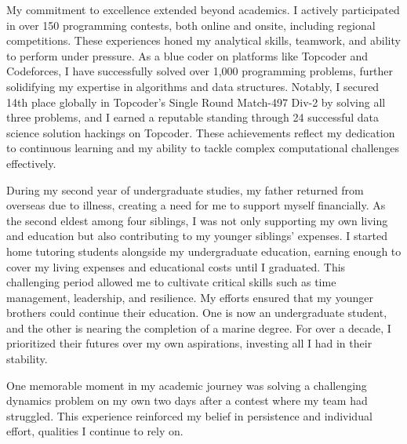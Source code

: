 \documentclass[11pt]{article}
\newif\ifshowsections
\begin{document}
\ifshowsections\section*{Programming Contest Experience}\fi

My commitment to excellence extended beyond academics. I actively participated in over 150 programming
contests, both online and onsite, including regional competitions. These experiences honed my analytical
skills, teamwork, and ability to perform under pressure. As a blue coder on platforms like Topcoder and
Codeforces, I have successfully solved over 1,000 programming problems, further solidifying my expertise
in algorithms and data structures. Notably, I secured 14th place globally in Topcoder's Single Round
Match-497 Div-2 by solving all three problems, and I earned a reputable standing through 24 successful
data science solution hackings on Topcoder. These achievements reflect my dedication to continuous
learning and my ability to tackle complex computational challenges effectively.

\ifshowsections\section*{Personal Resilience and Sacrifices}\fi

During my second year of undergraduate studies, my father returned from overseas due to illness,
creating a need for me to support myself financially. As the second eldest among four siblings, I was
not only supporting my own living and education but also contributing to my younger siblings' expenses.
I started home tutoring students alongside my undergraduate education, earning enough to cover my
living expenses and educational costs until I graduated. This challenging period allowed me to cultivate
critical skills such as time management, leadership, and resilience. My efforts ensured that my younger
brothers could continue their education. One is now an undergraduate student, and the other is nearing the
completion of a marine degree. For over a decade, I prioritized their futures over my own aspirations,
investing all I had in their stability.

One memorable moment in my academic journey was solving a challenging dynamics problem on my own two days
after a contest where my team had struggled. This experience reinforced my belief in persistence and
individual effort, qualities I continue to rely on.

\ifshowsections\section*{Professional Experience}\fi
\end{document}
